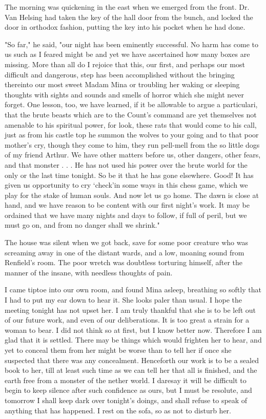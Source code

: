 The morning was quickening in the east when we emerged from the front. Dr. Van Helsing had taken the key of the hall door from the bunch, and locked the door in orthodox fashion, putting the key into his pocket when he had done. 

"So far," he said, "our night has been eminently successful. No harm has come to us such as I feared might be and yet we have ascertained how many boxes are missing. More than all do I rejoice that this, our first, and perhaps our most difficult and dangerous, step has been accomplished without the bringing thereinto our most sweet Madam Mina or troubling her waking or sleeping thoughts with sights and sounds and smells of horror which she might never forget. One lesson, too, we have learned, if it be allowable to argue a particulari, that the brute beasts which are to the Count's command are yet themselves not amenable to his spiritual power, for look, these rats that would come to his call, just as from his castle top he summon the wolves to your going and to that poor mother's cry, though they come to him, they run pell-mell from the so little dogs of my friend Arthur. We have other matters before us, other dangers, other fears, and that monster . . . He has not used his power over the brute world for the only or the last time tonight. So be it that he has gone elsewhere. Good! It has given us opportunity to cry `check'in some ways in this chess game, which we play for the stake of human souls. And now let us go home. The dawn is close at hand, and we have reason to be content with our first night's work. It may be ordained that we have many nights and days to follow, if full of peril, but we must go on, and from no danger shall we shrink." 

The house was silent when we got back, save for some poor creature who was screaming away in one of the distant wards, and a low, moaning sound from Renfield's room. The poor wretch was doubtless torturing himself, after the manner of the insane, with needless thoughts of pain. 

I came tiptoe into our own room, and found Mina asleep, breathing so softly that I had to put my ear down to hear it. She looks paler than usual. I hope the meeting tonight has not upset her. I am truly thankful that she is to be left out of our future work, and even of our deliberations. It is too great a strain for a woman to bear. I did not think so at first, but I know better now. Therefore I am glad that it is settled. There may be things which would frighten her to hear, and yet to conceal them from her might be worse than to tell her if once she suspected that there was any concealment. Henceforth our work is to be a sealed book to her, till at least such time as we can tell her that all is finished, and the earth free from a monster of the nether world. I daresay it will be difficult to begin to keep silence after such confidence as ours, but I must be resolute, and tomorrow I shall keep dark over tonight's doings, and shall refuse to speak of anything that has happened. I rest on the sofa, so as not to disturb her. 

